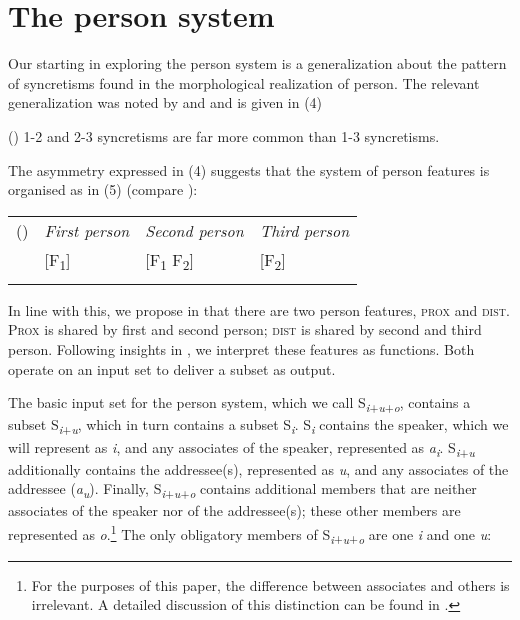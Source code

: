 \documentclass[output=paper]{langsci/langscibook}
\begin{document}
\section{The person system}
Our starting in exploring the person system is a generalization about the pattern of syncretisms found in the morphological realization of person. The relevant generalization was noted by \citet[59]{Baerman2005} and \citet{Baerman2011} and is given in (4) 

\ea (\label{bkm:Ref254353272})  1-2 and 2-3 syncretisms are far more common than 1-3 syncretisms.\z

The asymmetry expressed in (4) suggests that the system of person features is organised as in (5) (compare \citealt{Kerstens1993,Halle1997,Bennis2006,Aalberse2009,Aalberse2011}): 

\begin{tabularx}{\textwidth}{XXXX}
\lsptoprule
(\label{bkm:Ref295641111}) & \textit{First person} & \textit{Second person} & \textit{Third person}\\
& [F\textsubscript{1}] & [F\textsubscript{1} F\textsubscript{2}] & [F\textsubscript{2}]\\
\lspbottomrule
\end{tabularx}

In line with this, we propose in \citealt{Ackema2013} that there are two person features, \textsc{prox} and \textsc{dist}. \textsc{Prox} is shared by first and second person; \textsc{dist} is shared by second and third person. Following insights in \citealt{Harbour2016}, we interpret these features as functions. Both operate on an input set to deliver a subset as output. 

The basic input set for the person system, which we call S\textit{\textsubscript{i}}\textsubscript{+}\textit{\textsubscript{u}}\textsubscript{+}\textit{\textsubscript{o}}, contains a subset S\textit{\textsubscript{i}}\textsubscript{+}\textit{\textsubscript{u}}, which in turn contains a subset S\textit{\textsubscript{i}}. S\textit{\textsubscript{i}} contains the speaker, which we will represent as \textit{i}, and any associates of the speaker, represented as \textit{a\textsubscript{i}}. S\textit{\textsubscript{i}}\textsubscript{+}\textit{\textsubscript{u}} additionally contains the addressee(s), represented as \textit{u}, and any associates of the addressee (\textit{a\textsubscript{u}}). Finally, S\textit{\textsubscript{i}}\textsubscript{+}\textit{\textsubscript{u}}\textsubscript{+}\textit{\textsubscript{o}} contains additional members that are neither associates of the speaker nor of the addressee(s); these other members are represented as \textit{o}.\footnote{For the purposes of this paper, the difference between associates and others is irrelevant. A detailed discussion of this distinction can be found in \citet{Ackema2018}.} The only obligatory members of  S\textit{\textsubscript{i}}\textsubscript{+}\textit{\textsubscript{u}}\textsubscript{+}\textit{\textsubscript{o}} are one \textit{i} and one \textit{u}:
\end{document}
